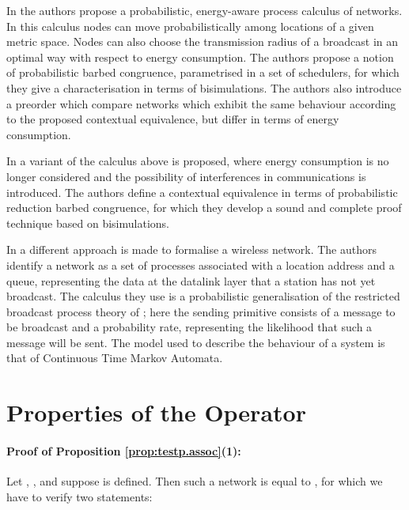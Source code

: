 \documentclass{LMCS}
\begin{document}
In \cite{gallina2011} the authors propose 
a probabilistic, energy-aware process calculus of networks. 
In this calculus nodes can move probabilistically 
among locations of a given metric space. Nodes can also choose the transmission 
radius of a broadcast in an optimal way with respect to energy consumption. 
The authors propose a notion of probabilistic barbed congruence, parametrised in a 
set of schedulers, for which they give a characterisation in terms of bisimulations. 
The authors also introduce a preorder which compare networks which exhibit 
the same behaviour according to the proposed contextual equivalence, but differ 
in terms of energy consumption.

In \cite{bugliesi2012} a variant of the calculus above is proposed, where 
energy consumption is no longer considered and the possibility of interferences in 
communications is introduced. The authors define a contextual equivalence in 
terms of probabilistic reduction barbed congruence, for which they develop a 
sound and complete proof technique based on bisimulations.

In \cite{ghassemi} a different approach is made to formalise a wireless 
network. The authors identify a network as a set of processes associated
 with a location address and a queue, representing the data 
at the datalink layer that a station has not yet broadcast. The calculus 
they use is a probabilistic generalisation of the restricted broadcast process theory 
of \cite{GwFM10}; here the sending primitive consists of a message to be broadcast and a probability 
rate, representing the likelihood that such a message will be sent. The 
model used to describe the behaviour of a system is that of 
Continuous Time Markov Automata.



\appendix

\section{Properties of the Operator }
\label{sec:operator.results}

\paragraph{\textbf{Proof of Proposition \ref{prop:testp.assoc}(1)}:} 
\label{proof:testP.closed}
Let , , 
and suppose  is defined. 
Then such a network is equal to , for which we have to verify two statements:
\end{document}
